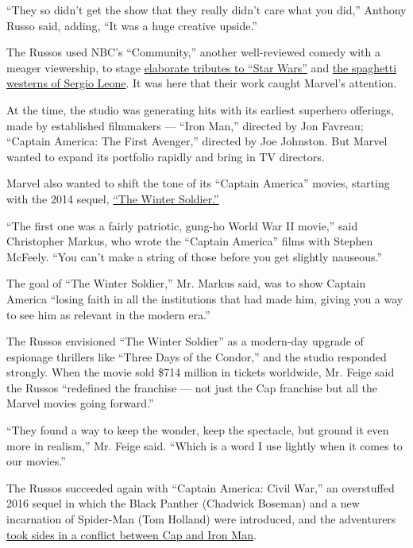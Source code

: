 ``They so didn't get the show that they really didn't care what you
did,'' Anthony Russo said, adding, ``It was a huge creative upside.''

The Russos used NBC's ``Community,'' another well-reviewed comedy with a
meager viewership, to stage
\href{https://www.youtube.com/watch?v=SeYmYNz6nbA}{elaborate tributes to
``Star Wars''} and
\href{https://www.youtube.com/watch?v=UPnLMslmUXQ}{the spaghetti
westerns of Sergio Leone}. It was here that their work caught Marvel's
attention.

At the time, the studio was generating hits with its earliest superhero
offerings, made by established filmmakers --- ``Iron Man,'' directed by
Jon Favreau; ``Captain America: The First Avenger,'' directed by Joe
Johnston. But Marvel wanted to expand its portfolio rapidly and bring in
TV directors.

Marvel also wanted to shift the tone of its ``Captain America'' movies,
starting with the 2014 sequel,
\href{https://www.youtube.com/watch?v=qXPOl6EjbWg}{``The Winter
Soldier.''}

``The first one was a fairly patriotic, gung-ho World War II movie,''
said Christopher Markus, who wrote the ``Captain America'' films with
Stephen McFeely. ``You can't make a string of those before you get
slightly nauseous.''

The goal of ``The Winter Soldier,'' Mr. Markus said, was to show Captain
America ``losing faith in all the institutions that had made him, giving
you a way to see him as relevant in the modern era.''

The Russos envisioned ``The Winter Soldier'' as a modern-day upgrade of
espionage thrillers like ``Three Days of the Condor,'' and the studio
responded strongly. When the movie sold \$714 million in tickets
worldwide, Mr. Feige said the Russos ``redefined the franchise --- not
just the Cap franchise but all the Marvel movies going forward.''

``They found a way to keep the wonder, keep the spectacle, but ground it
even more in realism,'' Mr. Feige said. ``Which is a word I use lightly
when it comes to our movies.''

The Russos succeeded again with ``Captain America: Civil War,'' an
overstuffed 2016 sequel in which the Black Panther (Chadwick Boseman)
and a new incarnation of Spider-Man (Tom Holland) were introduced, and
the adventurers \href{https://www.youtube.com/watch?v=5X8Mlrxk1Cg}{took
sides in a conflict between Cap and Iron Man}.


